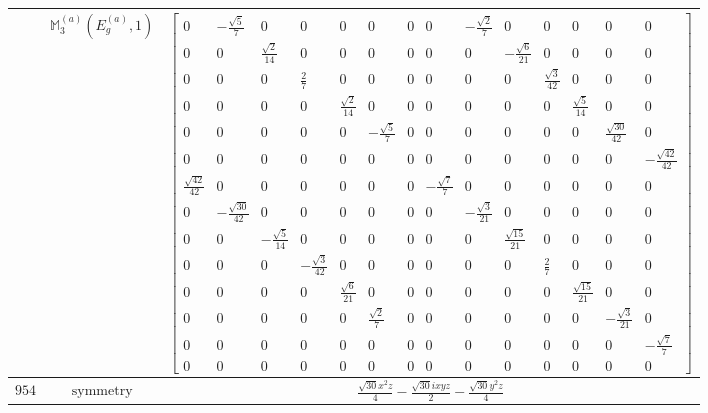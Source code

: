 \documentclass[fleqn,8pt,landscape]{jsarticle}
\begin{document}
\begin{longtable}{ccc}
$  $ & $ \mathbb{M}_{3}^{(a)}(E_{g}^{(a)},1) $ & $ \begin{bmatrix} 0 & - \frac{\sqrt{5}}{7} & 0 & 0 & 0 & 0 & 0 & 0 & - \frac{\sqrt{2}}{7} & 0 & 0 & 0 & 0 & 0 \\ 0 & 0 & \frac{\sqrt{2}}{14} & 0 & 0 & 0 & 0 & 0 & 0 & - \frac{\sqrt{6}}{21} & 0 & 0 & 0 & 0 \\ 0 & 0 & 0 & \frac{2}{7} & 0 & 0 & 0 & 0 & 0 & 0 & \frac{\sqrt{3}}{42} & 0 & 0 & 0 \\ 0 & 0 & 0 & 0 & \frac{\sqrt{2}}{14} & 0 & 0 & 0 & 0 & 0 & 0 & \frac{\sqrt{5}}{14} & 0 & 0 \\ 0 & 0 & 0 & 0 & 0 & - \frac{\sqrt{5}}{7} & 0 & 0 & 0 & 0 & 0 & 0 & \frac{\sqrt{30}}{42} & 0 \\ 0 & 0 & 0 & 0 & 0 & 0 & 0 & 0 & 0 & 0 & 0 & 0 & 0 & - \frac{\sqrt{42}}{42} \\ \frac{\sqrt{42}}{42} & 0 & 0 & 0 & 0 & 0 & 0 & - \frac{\sqrt{7}}{7} & 0 & 0 & 0 & 0 & 0 & 0 \\ 0 & - \frac{\sqrt{30}}{42} & 0 & 0 & 0 & 0 & 0 & 0 & - \frac{\sqrt{3}}{21} & 0 & 0 & 0 & 0 & 0 \\ 0 & 0 & - \frac{\sqrt{5}}{14} & 0 & 0 & 0 & 0 & 0 & 0 & \frac{\sqrt{15}}{21} & 0 & 0 & 0 & 0 \\ 0 & 0 & 0 & - \frac{\sqrt{3}}{42} & 0 & 0 & 0 & 0 & 0 & 0 & \frac{2}{7} & 0 & 0 & 0 \\ 0 & 0 & 0 & 0 & \frac{\sqrt{6}}{21} & 0 & 0 & 0 & 0 & 0 & 0 & \frac{\sqrt{15}}{21} & 0 & 0 \\ 0 & 0 & 0 & 0 & 0 & \frac{\sqrt{2}}{7} & 0 & 0 & 0 & 0 & 0 & 0 & - \frac{\sqrt{3}}{21} & 0 \\ 0 & 0 & 0 & 0 & 0 & 0 & 0 & 0 & 0 & 0 & 0 & 0 & 0 & - \frac{\sqrt{7}}{7} \\ 0 & 0 & 0 & 0 & 0 & 0 & 0 & 0 & 0 & 0 & 0 & 0 & 0 & 0 \end{bmatrix} $ \\ \hline
$ 954 $ & $ \text{symmetry} $ & $ \frac{\sqrt{30} x^{2} z}{4} - \frac{\sqrt{30} i x y z}{2} - \frac{\sqrt{30} y^{2} z}{4} $ \\

\end{longtable}
\end{document}
